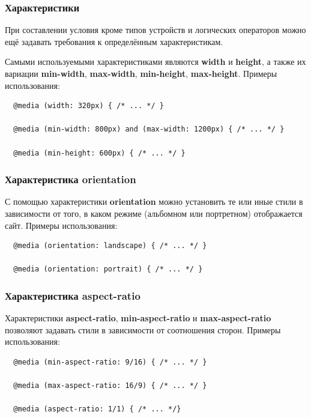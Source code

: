 \documentclass[aspectratio=169]{beamer}
\begin{document}
\begin{frame}[fragile]
  \frametitle{Характеристики}

  При составлении условия кроме типов устройств и логических операторов можно
  ещё задавать требования к определённым характеристикам.  

  \vspace*{1em}

  Самыми используемыми характеристиками являются \textbf{width} и
  \textbf{height}, а также их вариации \textbf{min-width}, \textbf{max-width},
  \textbf{min-height}, \textbf{max-height}. Примеры использования:

  \begin{verbatim}
  @media (width: 320px) { /* ... */ }

  @media (min-width: 800px) and (max-width: 1200px) { /* ... */ }

  @media (min-height: 600px) { /* ... */ }
  \end{verbatim}
\end{frame}

\begin{frame}[fragile]
  \frametitle{Характеристика orientation}

  С помощью характеристики \textbf{orientation} можно установить те или иные
  стили в зависимости от того, в каком режиме (альбомном или портретном)
  отображается сайт. Примеры использования:

  \begin{verbatim}
  @media (orientation: landscape) { /* ... */ }

  @media (orientation: portrait) { /* ... */ }
  \end{verbatim}
\end{frame}

\begin{frame}[fragile]
  \frametitle{Характеристика aspect-ratio}

  Характеристики \textbf{aspect-ratio}, \textbf{min-aspect-ratio} и
  \textbf{max-aspect-ratio} позволяют задавать стили в зависимости от
  соотношения сторон. Примеры использования:

  \begin{verbatim}
  @media (min-aspect-ratio: 9/16) { /* ... */ }

  @media (max-aspect-ratio: 16/9) { /* ... */ }

  @media (aspect-ratio: 1/1) { /* ... */}
  \end{verbatim}
\end{frame}
\end{document}
